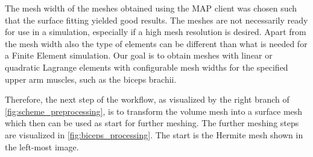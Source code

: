 The mesh width of the meshes obtained using the MAP client was chosen such that the surface fitting yielded good results. The meshes are not necessarily ready for use in a simulation, especially if a  high mesh resolution is desired. 
Apart from the mesh width also the type of elements can be different than what is needed for a Finite Element simulation. Our goal is to obtain meshes with linear or quadratic Lagrange elements with configurable mesh widths for the specified upper arm muscles, such as the biceps brachii.

Therefore, the next step of the workflow, as visualized by the right branch of \cref{fig:scheme_preprocessing}, is to transform the volume mesh into a surface mesh which then can be used as start for further meshing. The further meshing steps are visualized in \cref{fig:biceps_processing}. The start is the Hermite mesh shown in the left-most image.

